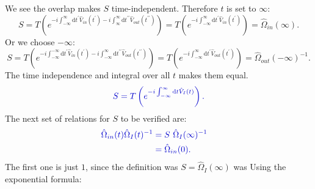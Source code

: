\documentclass[12pt, titlepage]{article}
\begin{document}
We see the overlap makes $ S $ time-independent. Therefore $ t $  is set to  $ \infty $:
\begin{equation}\label{eq:S_equal_in_infty}
S=T\left( e^{-i\int_{-\infty}^{\infty}\mathrm{d}t^{\prime} \hat{V}_{in}(t^{\prime})
	 -i\int_{\infty}^{\infty}\mathrm{d}t^{\prime \prime} \hat{V}_{out}(t^{\prime \prime})} \right)
=T\left( e^{-i\int_{-\infty}^{\infty}\mathrm{d}t^{\prime} \hat{V}_{in}(t^{\prime})}\right)
=\hat{\Omega}_{in}(\infty).
\end{equation}
Or we choose $ -\infty $:
\begin{equation}
S=T\left( e^{-i\int_{-\infty}^{-\infty}\mathrm{d}t^{\prime} \hat{V}_{in}(t^{\prime})
	 -i\int_{-\infty}^{\infty}\mathrm{d}t^{\prime \prime} \hat{V}_{out}(t^{\prime \prime})} \right)
=T\left( e^{-i\int_{-\infty}^{\infty}\mathrm{d}t^{\prime} \hat{V}_{out}(t^{\prime})}\right)
=\hat{\Omega}_{out}(-\infty)^{-1}.
\end{equation}
The time independence and integral over all $ t $ makes them equal. 
\begin{equation}\label{eq:S_equal_in_plus_minus_infty}
\textcolor[RGB]{0,0,204}{
S=T\left( e^{-i\int_{-\infty}^{\infty}\mathrm{d}t \hat{V}_{I}(t)}\right)
.}
\end{equation}
The next set of relations for $ S $ to be verified are:
\begin{subequations}
\textcolor[RGB]{0,0,204}{
\begin{align}
	\hat{\Omega}_{in}(t)\hat{\Omega}_{I}(t)^{-1}
	&=S\ \hat{\Omega}_{I}(\infty)^{-1}
	&\\
	&=
	\hat{\Omega}_{in}(0)	.
\end{align}
}
\end{subequations}
The first one is just $ 1 $, since the  definition was $ S = \hat{\Omega}_{I}(\infty) $ was 
Using the exponential formula:
\end{document}
